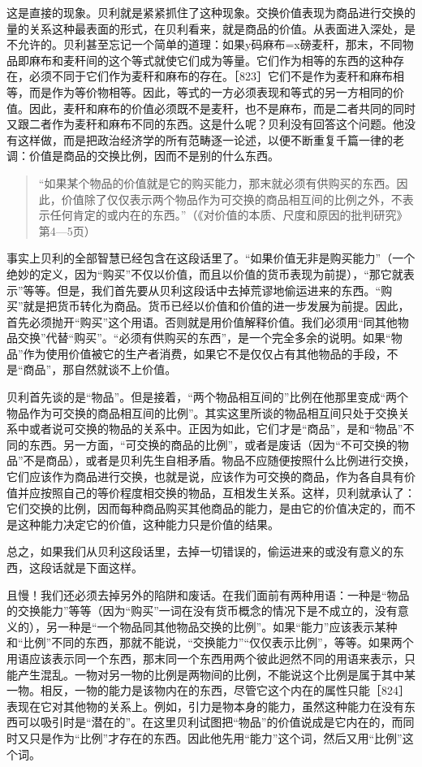 这是直接的现象。贝利就是紧紧抓住了这种现象。交换价值表现为商品进行交换的量的关系这种最表面的形式，在贝利看来，就是商品的价值。从表面进入深处，是不允许的。贝利甚至忘记一个简单的道理：如果y码麻布=x磅麦秆，那末，不同物品即麻布和麦秆间的这个等式就使它们成为等量。它们作为相等的东西的这种存在，必须不同于它们作为麦秆和麻布的存在。［823］它们不是作为麦秆和麻布相等，而是作为等价物相等。因此，等式的一方必须表现和等式的另一方相同的价值。因此，麦秆和麻布的价值必须既不是麦秆，也不是麻布，而是二者共同的同时又跟二者作为麦秆和麻布不同的东西。这是什么呢？贝利没有回答这个问题。他没有这样做，而是把政治经济学的所有范畴逐一论述，以便不断重复千篇一律的老调：价值是商品的交换比例，因而不是别的什么东西。

\begin{quote}{“如果某个物品的价值就是它的购买能力，那末就必须有供购买的东西。因此，价值除了仅仅表示两个物品作为可交换的商品相互间的比例之外，不表示任何肯定的或内在的东西。”（《对价值的本质、尺度和原因的批判研究》第4—5页）}\end{quote}

事实上贝利的全部智慧已经包含在这段话里了。“如果价值无非是购买能力”（一个绝妙的定义，因为“购买”不仅以价值，而且以价值的货币表现为前提），“那它就表示”等等。但是，我们首先要从贝利这段话中去掉荒谬地偷运进来的东西。“购买”就是把货币转化为商品。货币已经以价值和价值的进一步发展为前提。因此，首先必须抛开“购买”这个用语。否则就是用价值解释价值。我们必须用“同其他物品交换”代替“购买”。“必须有供购买的东西”，是一个完全多余的说明。如果“物品”作为使用价值被它的生产者消费，如果它不是仅仅占有其他物品的手段，不是“商品”，那自然就谈不上价值。

贝利首先谈的是“物品”。但是接着，“两个物品相互间的”比例在他那里变成“两个物品作为可交换的商品相互间的比例”。其实这里所谈的物品相互间只处于交换关系中或者说可交换的物品的关系中。正因为如此，它们才是“商品”，是和“物品”不同的东西。另一方面，“可交换的商品的比例”，或者是废话（因为“不可交换的物品”不是商品），或者是贝利先生自相矛盾。物品不应随便按照什么比例进行交换，它们应该作为商品进行交换，也就是说，应该作为可交换的商品，作为各自具有价值并应按照自己的等价程度相交换的物品，互相发生关系。这样，贝利就承认了：它们交换的比例，因而每种商品购买其他商品的能力，是由它的价值决定的，而不是这种能力决定它的价值，这种能力只是价值的结果。

总之，如果我们从贝利这段话里，去掉一切错误的，偷运进来的或没有意义的东西，这段话就是下面这样。

且慢！我们还必须去掉另外的陷阱和废话。在我们面前有两种用语：一种是“物品的交换能力”等等（因为“购买”一词在没有货币概念的情况下是不成立的，没有意义的），另一种是“一个物品同其他物品交换的比例”。如果“能力”应该表示某种和“比例”不同的东西，那就不能说，“交换能力”“仅仅表示比例”，等等。如果两个用语应该表示同一个东西，那末同一个东西用两个彼此迥然不同的用语来表示，只能产生混乱。一物对另一物的比例是两物间的比例，不能说这个比例是属于其中某一物。相反，一物的能力是该物内在的东西，尽管它这个内在的属性只能［824］表现在它对其他物的关系上。例如，引力是物本身的能力，虽然这种能力在没有东西可以吸引时是“潜在的”。在这里贝利试图把“物品”的价值说成是它内在的，而同时又只是作为“比例”才存在的东西。因此他先用“能力”这个词，然后又用“比例”这个词。


